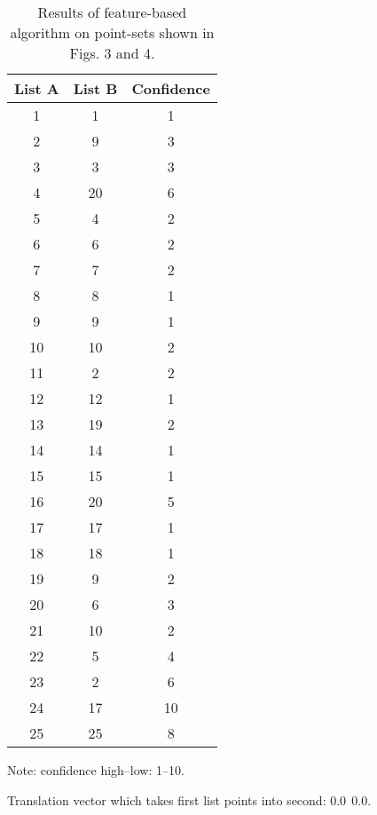 \newpage 
\begin{table}
\begin{center}
\begin{tabular}{c c c} 
List A  & List B & Confidence \\ \hline
  1 &  1 &  1 \\
  2 &  9 &  3 \\
  3 &  3 &  3 \\
  4 & 20 &  6 \\
  5 &  4 &  2 \\
  6 &  6 &  2 \\
  7 &  7 &  2 \\
  8 &  8 &  1 \\
  9 &  9 &  1 \\
 10 & 10 &  2 \\
 11 &  2 &  2 \\
 12 & 12 &  1 \\
 13 & 19 &  2 \\
 14 & 14 &  1 \\
 15 & 15 &  1 \\
 16 & 20 &  5 \\
 17 & 17 &  1 \\
 18 & 18 &  1 \\
 19 &  9 &  2 \\
 20 &  6 &  3 \\
 21 & 10 &  2 \\
 22 &  5 &  4 \\
 23 &  2 &  6 \\
 24 & 17 & 10 \\
 25 & 25 &  8 
\end{tabular}

\medskip

Note: confidence high--low: 1--10.

\medskip

Translation vector which takes first list points into second: 
$         0.0 \ \ 0.0$.

\medskip

\caption{Results of feature-based algorithm on point-sets shown in Figs. 3 and
4.}
\end{center}
\end{table}



\bye

